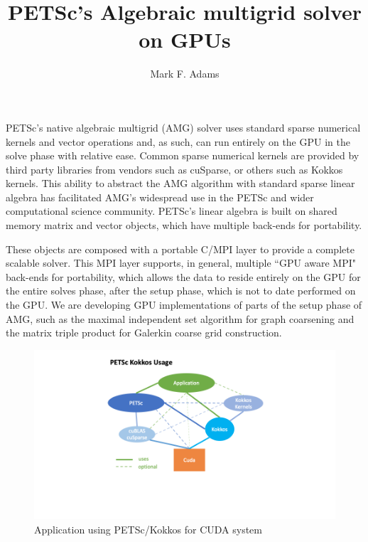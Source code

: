 \documentclass[5p,times]{elsarticle}
\newif\ifargonnereport
\begin{document}
%

\begin{frontmatter}

\title{PETSc's Algebraic multigrid solver on GPUs}


\author[lbnl-address]{Mark F. Adams}

\address[lbnl-address]{Lawrence Berkeley National Laboratory, Berkeley CA 94720 USA}
\end{frontmatter}


PETSc's native algebraic multigrid (AMG) solver uses standard sparse numerical kernels and vector operations and, as such, can run entirely on the GPU in the solve phase with relative ease.
Common sparse numerical kernels are provided by third party libraries from vendors such as cuSparse, or others such as Kokkos kernels.
This ability to abstract the AMG algorithm with standard sparse linear algebra has facilitated AMG's widespread use in the PETSc and wider computational science community.
PETSc's linear algebra is built on shared memory matrix and vector objects, which have multiple back-ends for portability.

These objects are composed with a portable C/MPI layer to provide a complete scalable solver.
This MPI layer supports, in general, multiple ``GPU aware MPI" back-ends for portability, which allows the data to reside entirely on the GPU for the entire solves phase, after the setup phase, which is not to date performed on the GPU.
We are developing GPU implementations of parts of the setup phase of AMG, such as the maximal independent set algorithm for graph coarsening and the matrix triple product for Galerkin coarse grid construction.

\begin{figure}[htbp]
\begin{center}
\includegraphics[trim = 2.8in 1.8in 2.8in .3in, clip, width=.79\linewidth]{PETSc-backends-kokkos-cuda.png}
\caption{Application using PETSc/Kokkos for CUDA system}
\label{fig:petsc_backends-kokkos}
\end{center}
\end{figure}
\end{document}
